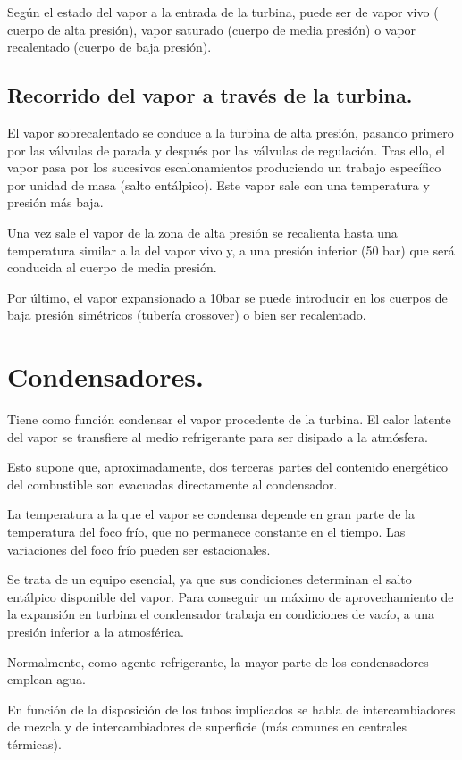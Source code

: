 Según el estado del vapor a la entrada de la turbina, puede ser de vapor vivo ( cuerpo de alta presión),
vapor saturado (cuerpo de media presión) o vapor recalentado (cuerpo de baja presión).





\subsection{Recorrido del vapor a través de la turbina.}
El vapor sobrecalentado se conduce a la turbina de alta presión, pasando primero por las válvulas de parada y después por las válvulas de regulación. Tras ello, el vapor pasa por los sucesivos escalonamientos produciendo un trabajo específico
por unidad de masa (salto entálpico). Este vapor sale con una temperatura y presión más baja.


Una vez sale el vapor de la zona de alta presión se recalienta hasta una temperatura similar a la del vapor vivo y, a una presión inferior (50 bar) que será conducida al cuerpo de media presión.

Por último, el vapor expansionado a 10bar se puede introducir en los cuerpos de baja presión simétricos (tubería crossover) o bien ser recalentado.
\section{Condensadores.}
Tiene como función condensar el vapor procedente de la turbina. El calor latente del vapor se transfiere al medio refrigerante para ser disipado a la atmósfera.

Esto supone que, aproximadamente, dos terceras partes del contenido energético del combustible
son evacuadas directamente al condensador.


La temperatura a la que el vapor se condensa depende en gran parte de la temperatura del foco
frío, que no permanece constante en el tiempo. Las variaciones del foco frío pueden ser
estacionales.



Se trata de un equipo esencial, ya que sus condiciones determinan el salto entálpico disponible del
vapor. Para conseguir un máximo de aprovechamiento de la expansión en turbina el condensador trabaja
en condiciones de vacío, a una presión inferior a la atmosférica.


Normalmente, como agente refrigerante, la mayor parte de los condensadores emplean agua.

En función de la disposición de los tubos implicados se habla de intercambiadores de mezcla y de intercambiadores de superficie (más comunes en centrales térmicas).

